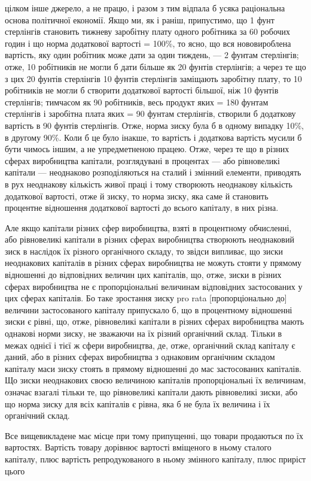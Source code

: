 \parcont{}  %
цілком інше джерело, а не працю, і разом з тим відпала б
усяка раціональна основа політичної економії. Якщо ми, як і раніш, припустимо, що 1 фунт стерлінгів
становить тижневу заробітну плату одного робітника за 60 робочих годин і що норма
додаткової вартості = 100\%, то ясно, що вся нововироблена
вартість, яку один робітник може дати за один тиждень, — 2 фунтам стерлінгів; отже, 10 робітників не
могли б дати більше як
20 фунтів стерлінгів; а через те що з цих 20 фунтів стерлінгів
10 фунтів стерлінгів заміщають заробітну плату, то 10 робітників не могли б створити додаткової
вартості більшої, ніж
10 фунтів стерлінгів; тимчасом як 90 робітників, весь продукт
яких = 180 фунтам стерлінгів і заробітна плата яких = 90 фунтам стерлінгів, створили б додаткову
вартість в 90 фунтів стерлінгів. Отже, норма зиску була б в одному випадку 10\%, в другому 90\%. Коли
б це було інакше, то вартість і додаткова
вартість мусили б бути чимось іншим, а не упредметненою
працею. Отже, через те що в різних сферах виробництва капітали, розглядувані в процентах — або
рівновеликі капітали —
неоднаково розподіляються на сталий і змінний елементи, приводять в рух неоднакову кількість живої
праці і тому створюють
неоднакову кількість додаткової вартості, отже й зиску, то
норма зиску, яка саме й становить процентне відношення додаткової вартості до всього капіталу, в них
різна.

Але якщо капітали різних сфер виробництва, взяті в процентному обчисленні, або рівновеликі капітали
в різних сферах
виробництва створюють неоднаковий зиск в наслідок їх різного
органічного складу, то звідси випливає, що зиски неоднакових
капіталів в різних сферах виробництва не можуть стояти у
прямому відношенні до відповідних величин цих капіталів,
що, отже, зиски в різних сферах виробництва не є пропорціональні величинам відповідних застосованих
у цих сферах капіталів. Бо таке зростання зиску pro rata [пропорціонально до] величини застосованого
капіталу припускало б, що в процентному відношенні зиски є рівні, що, отже, рівновеликі капітали
в різних сферах виробництва мають однакові норми зиску, не
зважаючи на їх різний органічний склад. Тільки в межах однієї
і тієї ж сфери виробництва, де, отже, органічний склад капіталу є даний, або в різних сферах
виробництва з однаковим
органічним складом капіталу маси зиску стоять в прямому відношенні до мас застосованих капіталів. Що
зиски неоднакових
своєю величиною капіталів пропорціональні їх величинам, означає
взагалі тільки те, що рівновеликі капітали дають рівновеликі
зиски, або що норма зиску для всіх капіталів є рівна, яка б
не була їх величина і їх органічний склад.

Все вищевикладене має місце при тому припущенні, що товари продаються по їх вартостях. Вартість
товару дорівнює
вартості вміщеного в ньому сталого капіталу, плюс вартість
репродукованого в ньому змінного капіталу, плюс приріст цього
\parbreak{}  %

